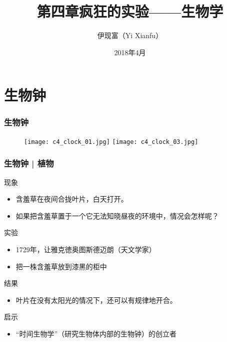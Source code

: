 



\title[生物学]{第四章\quad 疯狂的实验——生物学}
\author[Yixf]{伊现富（Yi Xianfu）}
\date{2018年4月}



\section{生物钟}
\begin{frame}
  \frametitle{生物钟}
  \begin{figure}
    \centering
    \texttt{[image: c4\_clock\_01.jpg]}
    \texttt{[image: c4\_clock\_03.jpg]}
  \end{figure}
\end{frame}

\begin{frame}
  \frametitle{生物钟 | 植物}
  \begin{block}{现象}
    \begin{itemize}
      \item 含羞草在夜间合拢叶片，白天打开。
      \item 如果把含羞草置于一个它无法知晓昼夜的环境中，情况会怎样呢？
    \end{itemize}
  \end{block}
  \pause
  \begin{block}{实验}
    \begin{itemize}
      \item 1729年，让\textbullet 雅克\textbullet 徳奥图斯\textbullet 德迈朗（天文学家）
      \item 把一株含羞草放到漆黑的柜中
    \end{itemize}
  \end{block}
  \pause
  \begin{block}{结果}
    \begin{itemize}
      \item 叶片在没有太阳光的情况下，还可以有规律地开合。
    \end{itemize}
  \end{block}
  \pause
  \begin{block}{启示}
    \begin{itemize}
      \item “时间生物学”（研究生物体内部的生物钟）的创立者
    \end{itemize}
  \end{block}
\end{frame}

